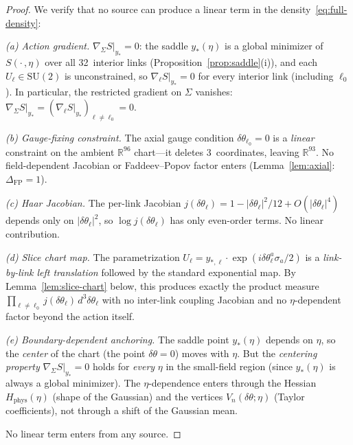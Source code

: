 \documentclass[11pt]{article}
\theoremstyle{definition}
\newcommand{\SU}{\mathrm{SU}}
\newcommand{\R}{\mathbb{R}}
\begin{document}
\begin{proof}
We verify that no source can produce a linear term
in the density~\eqref{eq:full-density}:

\emph{(a) Action gradient.}
$\nabla_\Sigma S|_{y_*}=0$: the saddle $y_*(\eta)$ is a global
minimizer of $S(\cdot\,,\eta)$ over all 32~interior links
(Proposition~\ref{prop:saddle}(i)), and each $U_\ell\in\SU(2)$
is unconstrained, so $\nabla_\ell S|_{y_*}=0$ for every
interior link (including $\ell_0$).  In particular, the
restricted gradient on $\Sigma$ vanishes:
$\nabla_\Sigma S|_{y_*}
=(\nabla_\ell S|_{y_*})_{\ell\ne\ell_0}=0$.

\emph{(b) Gauge-fixing constraint.}
The axial gauge condition $\delta\theta_{\ell_0}=0$ is a
\emph{linear} constraint on the ambient $\R^{96}$ chart---it
deletes 3~coordinates, leaving $\R^{93}$.  No field-dependent
Jacobian or Faddeev--Popov factor enters
(Lemma~\ref{lem:axial}: $\Delta_{\mathrm{FP}}=1$).

\emph{(c) Haar Jacobian.}
The per-link Jacobian $j(\delta\theta_\ell)
=1-|\delta\theta_\ell|^2/12+O(|\delta\theta_\ell|^4)$
depends only on $|\delta\theta_\ell|^2$, so
$\log j(\delta\theta_\ell)$ has only even-order terms.
No linear contribution.

\emph{(d) Slice chart map.}
The parametrization $U_\ell=y_{*,\ell}\cdot
\exp(i\delta\theta_\ell^a\sigma_a/2)$ is a
\emph{link-by-link left translation} followed by the
standard exponential map.  By Lemma~\ref{lem:slice-chart}
below, this produces exactly the product measure
$\prod_{\ell\ne\ell_0}j(\delta\theta_\ell)\,d^3\delta\theta_\ell$
with no inter-link coupling Jacobian and no
$\eta$-dependent factor beyond the action itself.

\emph{(e) Boundary-dependent anchoring.}
The saddle point $y_*(\eta)$ depends on $\eta$, so the
\emph{center} of the chart (the point $\delta\theta=0$)
moves with $\eta$.  But the \emph{centering property}
$\nabla_\Sigma S|_{y_*}=0$ holds for \emph{every} $\eta$
in the small-field region (since $y_*(\eta)$ is always a global
minimizer).  The $\eta$-dependence enters through the
Hessian $H_{\mathrm{phys}}(\eta)$ (shape of the Gaussian)
and the vertices $V_n(\delta\theta;\eta)$ (Taylor coefficients),
not through a shift of the Gaussian mean.

No linear term enters from any source.
\end{proof}
\end{document}
